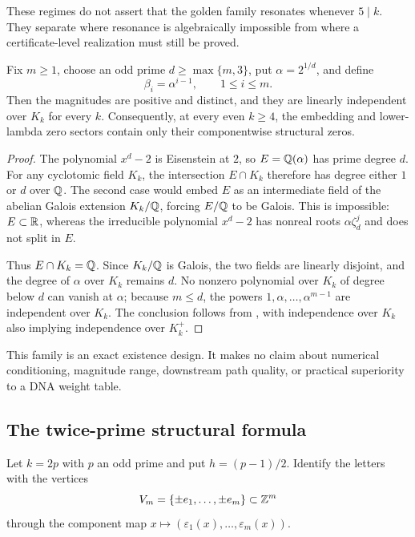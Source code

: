 These regimes do not assert that the golden family resonates whenever
$5\mid k$.  They separate where resonance is algebraically impossible from
where a certificate-level realization must still be proved.

\begin{corollary}
\label{cor:uniform-radical}
Fix $m\ge1$, choose an odd prime $d\ge\max\{m,3\}$, put
$\alpha=2^{1/d}$, and define
\begin{equation}
  \beta_i=\alpha^{i-1},\qquad 1\le i\le m.                              \label{eq:uniform-radical}
\end{equation}
Then the magnitudes are positive and distinct, and they are linearly
independent over $K_k$ for every $k$.  Consequently, at every even
$k\ge4$, the embedding and lower-lambda zero sectors contain only their
componentwise structural zeros.
\end{corollary}

\begin{proof}
The polynomial $x^d-2$ is Eisenstein at $2$, so
$E=\mathbb Q(\alpha)$ has prime degree $d$.  For any cyclotomic field $K_k$, the
intersection $E\cap K_k$ therefore has degree either $1$ or $d$ over $\mathbb Q$.
The second case would embed $E$ as an intermediate field of the abelian
Galois extension $K_k/\mathbb Q$, forcing $E/\mathbb Q$ to be Galois.  This is impossible:
$E\subset\mathbb R$, whereas the irreducible polynomial $x^d-2$ has nonreal roots
$\alpha\zeta_d^j$ and does not split in $E$.

Thus $E\cap K_k=\mathbb Q$.  Since $K_k/\mathbb Q$ is Galois, the two fields are linearly
disjoint, and the degree of $\alpha$ over $K_k$ remains $d$.  No nonzero
polynomial over $K_k$ of degree below $d$ can vanish at $\alpha$; because
$m\le d$, the powers $1,\alpha,\ldots,\alpha^{m-1}$ are independent over
$K_k$.  The conclusion follows from , with
independence over $K_k$ also implying independence over $K_k^+$.
\end{proof}

This family is an exact existence design.  It makes no claim about numerical
conditioning, magnitude range, downstream path quality, or practical
superiority to a DNA weight table.

\subsection{The twice-prime structural formula}
\label{sec:twice-prime-structural}

Let $k=2p$ with $p$ an odd prime and put $h=(p-1)/2$.  Identify the letters
with the vertices
\[
  V_m=\{\pm e_1,\ldots,\pm e_m\}\subset\mathbb Z^m
\]
through the component map $x\mapsto(\varepsilon_1(x),\ldots,
\varepsilon_m(x))$.

